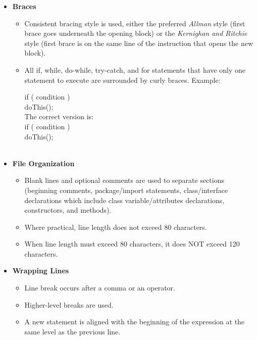 \documentclass[\mainpath/main]{subfiles}
\begin{document}
\begin{itemize}
		\item \textbf{Braces}
		\begin{itemize}
			\item Consistent bracing style is used, either the preferred \textit{Allman} style (first brace goes underneath the opening block) or the \textit{Kernighan and Ritchie} style (first brace is on the same line of the instruction that opens the new block).
			\item All if, while, do-while, try-catch, and for statements that have only one statement to execute are surrounded by curly braces. Example:
			
			\parbox{\textwidth}{
			\hspace*{1cm}if ( condition )\\
			\hspace*{2cm} doThis();\\
			The correct version is:\\
			\hspace*{1cm}if ( condition ) \textbraceleft \\
			\hspace*{2cm}doThis();\\
			\textbraceright \\}
			
		\end{itemize}
		
		\item \textbf{File Organization}
		\begin{itemize}
			\item Blank lines and optional comments are used to separate sections (beginning comments, package/import statements, class/interface declarations which include class variable/attributes declarations, constructors, and methods).
			\item Where practical, line length does not exceed 80 characters.
			\item When line length must exceed 80 characters, it does NOT exceed 120 characters.
		\end{itemize}
		
		\item \textbf{Wrapping Lines}
		\begin{itemize}
			\item Line break occurs after a comma or an operator.
			\item Higher-level breaks are used.
			\item A new statement is aligned with the beginning of the expression at the
             same level as the previous line.
		\end{itemize}
		

\end{itemize}
\end{document}
